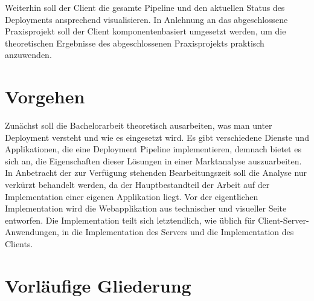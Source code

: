 \documentclass{scrartcl}
\begin{document}
Weiterhin soll der Client die gesamte Pipeline und den aktuellen Status des Deployments ansprechend visualisieren. In Anlehnung an das abgeschlossene Praxisprojekt soll der Client komponentenbasiert umgesetzt werden, um die theoretischen Ergebnisse des abgeschlossenen Praxisprojekts praktisch anzuwenden.

\section{Vorgehen}
\label{sec:vorgehen}

Zunächst soll die Bachelorarbeit theoretisch ausarbeiten, was man unter Deployment versteht und wie es eingesetzt wird. Es gibt verschiedene Dienste und Applikationen, die eine Deployment Pipeline implementieren, demnach bietet es sich an, die Eigenschaften dieser Lösungen in einer Marktanalyse auszuarbeiten. In Anbetracht der zur Verfügung stehenden Bearbeitungszeit soll die Analyse nur verkürzt behandelt werden, da der Hauptbestandteil der Arbeit auf der Implementation einer eigenen Applikation liegt. Vor der eigentlichen Implementation wird die Webapplikation aus technischer und visueller Seite entworfen. Die Implementation teilt sich letztendlich, wie üblich für Client-Server-Anwendungen, in die Implementation des Servers und die Implementation des Clients.


\section{Vorläufige Gliederung}
\label{sec:gliederung}
\end{document}
